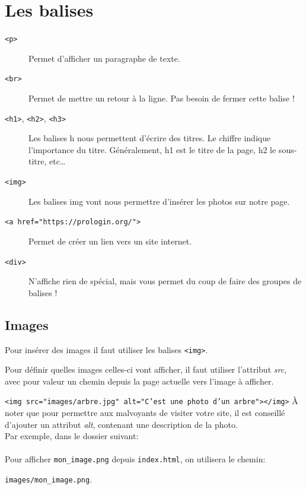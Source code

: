 \section{Les balises}
\begin{description}
\item[\texttt{<p>}] Permet d'afficher un paragraphe de texte.
\item[\texttt{<br>}] Permet de mettre un retour à la ligne. Pas besoin
  de fermer cette balise !
\item[\texttt{<h1>}, \texttt{<h2>}, \texttt{<h3>}] Les
  balises h nous permettent d’écrire des titres. Le chiffre indique l'importance
  du titre. Généralement, h1 est le titre de la page, h2 le sous-titre, etc…
\item[\texttt{<img>}] Les balises img vont nous permettre d’insérer les
  photos sur notre page.
\item[\texttt{<a href="https://prologin.org/">}] Permet de créer un
  lien vers un site internet.
\item[\texttt{<div>}] N'affiche rien de spécial, mais vous permet du
  coup de faire des groupes de balises !
\end{description}

\subsection{Images}
Pour insérer des images il faut utiliser les balises \texttt{<img>}.

Pour définir quelles images celles-ci vont afficher, il faut utiliser l’attribut
\textit{src}, avec pour valeur un chemin depuis la page actuelle vers l'image à
afficher.

\texttt{<img src="images/arbre.jpg" alt="C’est une photo d’un arbre"></img>}
À noter que pour permettre aux malvoyants de visiter votre site, il est
conseillé d’ajouter un attribut \textit{alt}, contenant une description de la photo.\\

Par exemple, dans le dossier suivant:\\

\hfill\\
Pour afficher \texttt{mon\_image.png} depuis \texttt{index.html}, on utilisera
le chemin:
\begin{center}
  \texttt{images/mon\_image.png}.
\end{center}
\hfill\\

